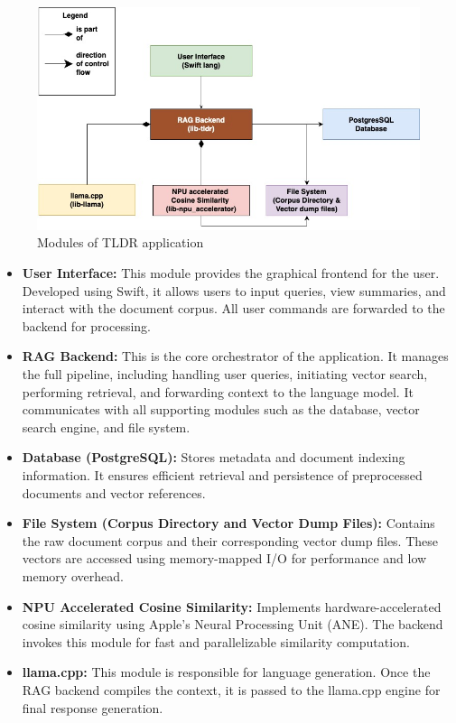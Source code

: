 \begin{figure}[H]
    \centering
    \includegraphics[width=1.0\linewidth]{images/tldr-app-modules.jpg}
    \caption{Modules of TLDR application}
    \label{fig:tldr_modules}
\end{figure}

\begin{itemize}
    \item \textbf{User Interface:} This module provides the graphical frontend for the user. Developed using Swift, it allows users to input queries, view summaries, and interact with the document corpus. All user commands are forwarded to the backend for processing.

    \item \textbf{RAG Backend:} This is the core orchestrator of the application. It manages the full pipeline, including handling user queries, initiating vector search, performing retrieval, and forwarding context to the language model. It communicates with all supporting modules such as the database, vector search engine, and file system.

    \item \textbf{Database (PostgreSQL):} Stores metadata and document indexing information. It ensures efficient retrieval and persistence of preprocessed documents and vector references.

    \item \textbf{File System (Corpus Directory and Vector Dump Files):} Contains the raw document corpus and their corresponding vector dump files. These vectors are accessed using memory-mapped I/O for performance and low memory overhead.


    \item \textbf{NPU Accelerated Cosine Similarity:} Implements hardware-accelerated cosine similarity using Apple's Neural Processing Unit (ANE). The backend invokes this module for fast and parallelizable similarity computation.

    \item \textbf{llama.cpp:} This module is responsible for language generation. Once the RAG backend compiles the context, it is passed to the llama.cpp engine for final response generation.
\end{itemize}


